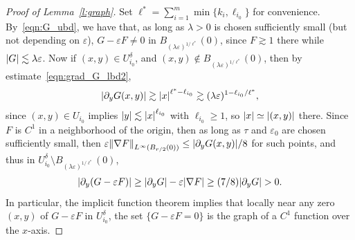 \documentclass[AHL,Unicode,longabstracts,published]{cedram}
\newcommand{\norm}[1]{\left \lVert #1 \right \rVert}
\newcommand{\abs}[1]{\left \lvert #1 \right \rvert}
\renewcommand{\epsilon}{\varepsilon}
\let\originalleft\left
\let\originalright\right
\renewcommand{\left}{\mathopen{}\mathclose\bgroup\originalleft}
\renewcommand{\right}{\aftergroup\egroup\originalright}
\begin{document}
\begin{proof}[Proof of Lemma~\ref{l:graph}]
Set $\ell^* = \sum_{i=1}^m \min\{k_i, \ell_{i_0}\}$ for convenience. By~\eqref{eqn:G_ubd}, we have that, as long as $\lambda >0$ is chosen sufficiently small (but not depending on $\epsilon$), $G - \epsilon F \ne 0$ in $B_{(\lambda \epsilon)^{1/\ell^*}}(0)$, since $F \gtrsim 1$ there while $\abs{G} \lesssim \lambda \epsilon$. Now if $(x,y) \in U_{i_0}^\delta$, and $(x,y) \not \in B_{(\lambda \epsilon)^{1/\ell^*}}(0)$, then by estimate~\eqref{eqn:grad_G_lbd2},
\begin{align*}
\abs{\partial_y G(x,y)} \gtrsim \abs{x}^{\ell^* - \ell_{i_0}} \gtrsim (\lambda \epsilon)^{1 - \ell_{i_0}/\ell^*},
\end{align*}
since $(x,y) \in U_{i_0}$ implies $\abs{y} \lesssim \abs{x}^{\ell_{i_0}}$ with $\ell_{i_0} \ge 1$, so $\abs{x} \simeq \abs{(x,y)}$ there. Since $F$ is $C^1$ in a neighborhood of the origin, then as long as $\tau$ and $\epsilon_0$ are chosen sufficiently small, then $\epsilon \norm{\nabla F}_{L^\infty(B_{r/2}(0))} \le \abs{ \partial_y G(x,y)}/8$ for such points, and thus in $U_{i_0}^\delta \setminus B_{(\lambda \epsilon)^{1/\ell^*}}(0) $,
\begin{align}
\abs{\partial_y(G - \epsilon F)} \ge \abs{\partial_y G} - \epsilon \abs{\nabla F} \ge (7/8) \abs{\partial_y G} > 0. \label{eqn:grad_H_lbd}
\end{align}
In particular, the implicit function theorem implies that locally near any zero $(x, y)$ of $G - \epsilon F$ in $U_{i_0}^\delta$, the set $\{G - \epsilon F = 0\}$ is the graph of a $C^1$ function over the $x$-axis.


\end{proof}
\end{document}
